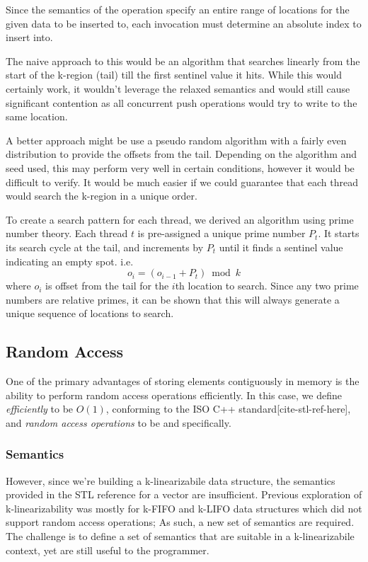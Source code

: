 \documentclass{sigplanconf}
\begin{document}
Since the semantics of the operation specify an entire range of locations
for the given data to be inserted to, each invocation must determine an absolute index to insert into.

The naive approach to this would be an algorithm that searches linearly
from the start of the k-region (tail) till the first sentinel value
it hits. While this would certainly work, it wouldn't leverage the
relaxed semantics and would still cause significant contention as
all concurrent push operations would try to write to the same location.

A better approach might be use a pseudo random algorithm with a fairly
even distribution to provide the offsets from the tail. Depending
on the algorithm and seed used, this may perform very well in certain
conditions, however it would be difficult to verify. It would be much
easier if we could guarantee that each thread would search the k-region
in a unique order.

To create a search pattern for each thread, we derived an algorithm
using prime number theory. Each thread $t$ is pre-assigned a unique
prime number $P_{t}$. It starts its search cycle at the tail, and
increments by $P_{t}$ until it finds a sentinel value indicating
an empty spot. i.e.
$$o_{i}=(o_{i-1}+P_{t})\bmod{k}$$
where $o_{i}$ is offset from the tail for the $i$th location to
search. Since any two prime numbers are relative primes, it can be
shown that this will always generate a unique sequence of locations
to search.

\subsection{Random Access}

One of the primary advantages of storing elements contiguously in memory is the ability to perform random access operations efficiently. In this case, we define \emph{efficiently} to be $O(1)$, conforming to the ISO C++ standard[cite-stl-ref-here], and \emph{random access operations} to be  and  specifically.

\subsubsection{Semantics}
However, since we're building a k-linearizabile data structure, the semantics provided in the STL reference for a vector are insufficient. Previous exploration of k-linearizability was mostly for k-FIFO and k-LIFO data structures which did not support random access operations; As such, a new set of semantics are required. The challenge is to define a set of semantics that are suitable in a k-linearizabile context, yet are still useful to the programmer.
\end{document}
